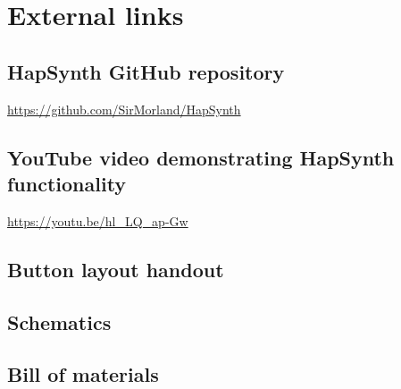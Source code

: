
\newrefcontext[sorting=nyt]
\printbibliography[heading=bibintoc]



\begin{appendices}

\chapter{External links}
\label{ch:links}
\section{HapSynth GitHub repository} \label{ch:github}
\url{https://github.com/SirMorland/HapSynth}
\section{YouTube video demonstrating HapSynth functionality} \label{ch:youtube}
\url{https://youtu.be/hl_LQ_ap-Gw}

    \begin{landscape}
        \chapter{Button layout handout}
        \thispagestyle{empty}
        \label{ch:button}
        
    \end{landscape}
\restoregeometry

    \begin{landscape}
        \chapter{Schematics}
        \thispagestyle{empty}
        \label{ch:schematics}
        
    \end{landscape}
\restoregeometry

    \begin{landscape}
        \chapter{Bill of materials}
        \thispagestyle{empty}
        \label{ch:bom}
        
    \end{landscape}
\restoregeometry

\end{appendices}

